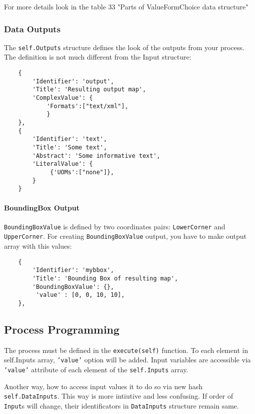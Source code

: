 \documentclass[a4paper,11pt]{article}
\begin{document}
    For more details look in the table 33 "Parts of ValueFormChoice data
    structure"


    \subsubsection{Data Outputs}
     
    The \texttt{self.Outputs} structure defines the look of the outputs from your process.
    The definition is not much different from the Input structure:
     

    \begin{verbatim}
    {
        'Identifier': 'output',
        'Title': 'Resulting output map',
        'ComplexValue': {
            'Formats':["text/xml"],
            }
    },
    {
        'Identifier': 'text',
        'Title': 'Some text',
        'Abstract': 'Some informative text',
        'LiteralValue': {
             {'UOMs':["none"]},
        }
    }
    \end{verbatim}

    \paragraph{BoundingBox Output}
    \texttt{BoundingBoxValue} is defined by two coordinates pairs:
    \texttt{LowerCorner} and \texttt{UpperCorner}. For creating
    \texttt{BoundingBoxValue}    output, you have to make output array with this
    values:
    \begin{verbatim}
    {
        'Identifier': 'mybbox',
        'Title': 'Bounding Box of resulting map',
        'BoundingBoxValue': {},
         'value' : [0, 0, 10, 10],
    },
    \end{verbatim}


    \subsection{Process Programming}
     
    The process must be defined in the \texttt{execute(self)} function. To
    each element in self.Inputs array, \texttt{'value'} option will be added.
    Input variables are accessible via \texttt{'value'} attribute of each element of the
    \texttt{self.Inputs} array. 

    Another way, how to access input values it to do so via new hash \texttt{self.DataInputs}. This way is 
    more intiutive and less confusing. If order of \texttt{Input}s will change, their identificators in \texttt{DataInputs} structure remain same.
    
\end{document}
